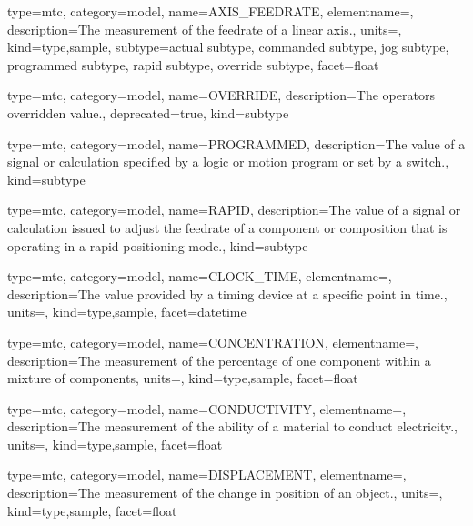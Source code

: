{
  type=mtc,
  category=model,
  name={AXIS\_FEEDRATE},
  elementname=,
  description={The measurement of the feedrate of a linear axis.},
  units=,
  kind={type,sample},
  subtype={\gls{actual subtype}, \gls{commanded subtype}, \gls{jog subtype}, \gls{programmed subtype}, \gls{rapid subtype}, \gls{override subtype}},
  facet={\gls{float}}
}



{
  type=mtc,
  category=model,
  name={OVERRIDE},
  description={The operators overridden value.},
  deprecated={true},
  kind={subtype}
}


{
  type=mtc,
  category=model,
  name={PROGRAMMED},
  description={The value of a signal or calculation specified by a logic or motion program or set by a switch.},
  kind={subtype}
}


{
  type=mtc,
  category=model,
  name={RAPID},
  description={The value of a signal or calculation issued to adjust the feedrate of a component or composition that is operating in a rapid positioning mode.},
  kind={subtype}
}


{
  type=mtc,
  category=model,
  name={CLOCK\_TIME},
  elementname=,
  description={The value provided by a timing device at a specific point in time.},
  units=,
  kind={type,sample},
  facet={\gls{datetime}}
}


{
  type=mtc,
  category=model,
  name={CONCENTRATION},
  elementname=,
  description={The measurement of the percentage of one component within a mixture of components},
  units=,
  kind={type,sample},
  facet={\gls{float}}
}


{
  type=mtc,
  category=model,
  name={CONDUCTIVITY},
  elementname=,
  description={The measurement of the ability of a material to conduct electricity.},
  units=,
  kind={type,sample},
  facet={\gls{float}}
}


{
  type=mtc,
  category=model,
  name={DISPLACEMENT},
  elementname=,
  description={The measurement of the change in position of an object.},
  units=,
  kind={type,sample},
  facet={\gls{float}}
}


